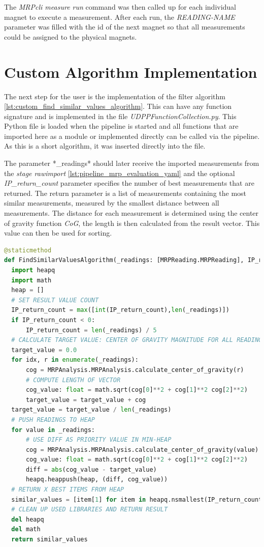 The \emph{MRPcli measure run} command was then called up for each
individual magnet to execute a measurement. After each run, the
\emph{READING-NAME} parameter was filled with the id of the next magnet
so that all measurements could be assigned to the physical magnets.

\hypertarget{custom-algorithm-implementation}{%
\section{Custom Algorithm
Implementation}\label{custom-algorithm-implementation}}

The next step for the user is the implementation of the filter algorithm
\ref{lst:custom_find_similar_values_algorithm}. This can have any
function signature and is implemented in the file
\emph{UDPPFunctionCollection.py}. This Python file is loaded when the
pipeline is started and all functions that are imported here as a module
or implemented directly can be called via the pipeline. As this is a
short algorithm, it was inserted directly into the file.

The parameter *\_readings* should later receive the imported
measurements from the \emph{stage rawimport}
\ref{lst:pipeline_mrp_evaluation_yaml} and the optional
\emph{IP\_return\_count} parameter specifies the number of best
measurements that are returned. The return parameter is a list of
measurements containing the most similar measurements, measured by the
smallest distance between all measurements. The distance for each
measurement is determined using the center of gravity function
\emph{CoG}, the length is then calculated from the result vector. This
value can then be used for sorting.

\begin{lstlisting}[language=Python, caption={User implemented custom find most similar readings algorithm}, label=lst:custom_find_similar_values_algorithm]
@staticmethod
def FindSimilarValuesAlgorithm(_readings: [MRPReading.MRPReading], IP_return_count: int = -1) -> [MRPReading.MRPReading]:
  import heapq
  import math
  heap = []
  # SET RESULT VALUE COUNT
  IP_return_count = max([int(IP_return_count),len(_readings)])
  if IP_return_count < 0:
      IP_return_count = len(_readings) / 5
  # CALCULATE TARGET VALUE: CENTER OF GRAVITY MAGNITUDE FOR ALL READINGS
  target_value = 0.0
  for idx, r in enumerate(_readings):
      cog = MRPAnalysis.MRPAnalysis.calculate_center_of_gravity(r)
      # COMPUTE LENGTH OF VECTOR
      cog_value: float = math.sqrt(cog[0]**2 + cog[1]**2 cog[2]**2)
      target_value = target_value + cog
  target_value = target_value / len(_readings)
  # PUSH READINGS TO HEAP
  for value in _readings:
      # USE DIFF AS PRIORITY VALUE IN MIN-HEAP
      cog = MRPAnalysis.MRPAnalysis.calculate_center_of_gravity(value)
      cog_value: float = math.sqrt(cog[0]**2 + cog[1]**2 cog[2]**2)
      diff = abs(cog_value - target_value)
      heapq.heappush(heap, (diff, cog_value))
  # RETURN X BEST ITEMS FROM HEAP
  similar_values = [item[1] for item in heapq.nsmallest(IP_return_count, heap)]
  # CLEAN UP USED LIBRARIES AND RETURN RESULT
  del heapq
  del math
  return similar_values
\end{lstlisting}

